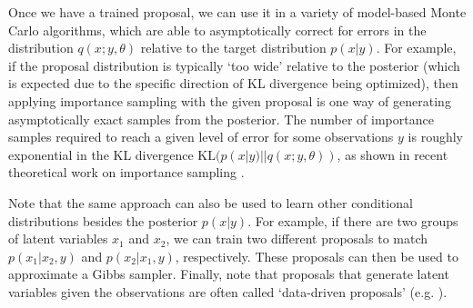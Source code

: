 Once we have a trained proposal, we can use it in a variety of model-based Monte Carlo algorithms, which are able to asymptotically correct for errors in the distribution $q(x; y, \theta)$ relative to the target distribution $p(x | y)$.
For example, if the proposal distribution is typically `too wide' relative to the posterior (which is expected due to the specific direction of KL divergence being optimized), then applying importance sampling with the given proposal is one way of generating asymptotically exact samples from the posterior.
The number of importance samples required to reach a given level of error for some observations $y$ is roughly exponential in the KL divergence $\mbox{KL}(p(x | y) || q(x; y, \theta))$, as shown in recent theoretical work on importance sampling \cite{chatterjee2018sample}.

Note that the same approach can also be used to learn other conditional distributions besides the posterior $p(x | y)$.
For example, if there are two groups of latent variables $x_1$ and $x_2$, we can train two different proposals to match $p(x_1 | x_2, y)$ and $p(x_2 | x_1, y)$, respectively.
These proposals can then be used to approximate a Gibbs sampler.
Finally, note that proposals that generate latent variables given the observations are often called `data-driven proposals' (e.g. \cite{tu2002image}).


